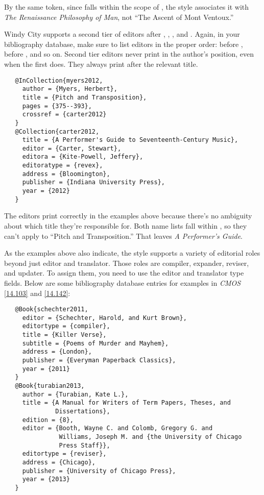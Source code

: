 \documentclass[11pt,letterpaper,oneside]{article}
\begin{document}
\noindent By the same token, since  falls within the
scope of , the style associates it with
\textit{The Renaissance Philosophy of Man}, not ``The Ascent of Mont
Ventoux.''

Windy City supports a second tier of editors after ,
, , and .
Again, in your bibliography database, make sure to list editors in the
proper order:  before ,
 before , and so on. Second tier
editors never print in the author's position, even when the first
does. They always print after the relevant title.

\begin{verbatim}
   @InCollection{myers2012,
     author = {Myers, Herbert},
     title = {Pitch and Transposition},
     pages = {375--393},
     crossref = {carter2012}
   }
   @Collection{carter2012,
     title = {A Performer's Guide to Seventeenth-Century Music},
     editor = {Carter, Stewart},
     editora = {Kite-Powell, Jeffery},
     editoratype = {revex},
     address = {Bloomington},
     publisher = {Indiana University Press},
     year = {2012}
   }
\end{verbatim}

\begin{bibonly}
\nocite{myers2012,carter2012}
\end{bibonly}

The editors print correctly in the examples above because there's no
ambiguity about which title they're responsible for. Both name lists
fall within , so they can't apply to ``Pitch and
Transposition.'' That leaves \textit{A Performer's Guide}.

As the examples above also indicate, the style supports a variety of
editorial roles beyond just editor and translator. Those roles are
compiler, expander, reviser, and updater. To assign them, you need to
use the editor and translator type fields. Below are some bibliography
database entries for examples in \textit{CMOS} \ref{14.103} and
\ref{14.142}:

\begin{verbatim}
   @Book{schechter2011,
     editor = {Schechter, Harold, and Kurt Brown},
     editortype = {compiler},
     title = {Killer Verse},
     subtitle = {Poems of Murder and Mayhem},
     address = {London},
     publisher = {Everyman Paperback Classics},
     year = {2011}
   }
   @Book{turabian2013,
     author = {Turabian, Kate L.},
     title = {A Manual for Writers of Term Papers, Theses, and
              Dissertations},
     edition = {8},
     editor = {Booth, Wayne C. and Colomb, Gregory G. and
               Williams, Joseph M. and {the University of Chicago
               Press Staff}},
     editortype = {reviser},
     address = {Chicago},
     publisher = {University of Chicago Press},
     year = {2013}
   }
\end{verbatim}
\end{document}
